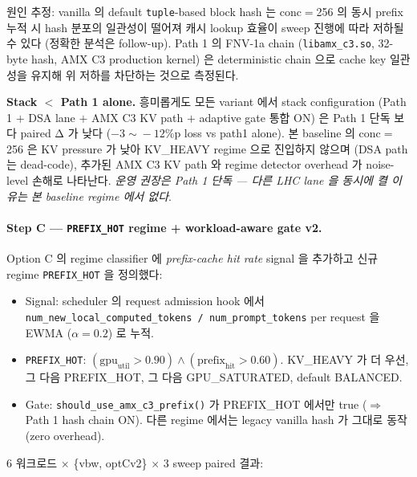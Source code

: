 {원인 추정: vanilla 의 default \texttt{tuple}-based block hash 는
conc$=$256 의 동시 prefix 누적 시 hash 분포의 일관성이 떨어져 캐시 lookup
효율이 sweep 진행에 따라 저하될 수 있다 (정확한 분석은 follow-up).
Path 1 의 FNV-1a chain (\texttt{libamx\_c3.so}, 32-byte hash, AMX C3 production
kernel) 은 deterministic chain 으로 cache key 일관성을 유지해 위 저하를
차단하는 것으로 측정된다.

\textbf{Stack $<$ Path 1 alone.} 흥미롭게도 모든 variant 에서 stack
configuration (Path 1 $+$ DSA lane $+$ AMX C3 KV path $+$ adaptive gate
통합 ON) 은 Path 1 단독 보다 paired Δ 가 낮다 ($-3{\sim}\!-12\%\textrm{p}$
loss vs path1 alone). 본 baseline 의 conc$=$256 은 KV pressure 가 낮아
KV\_HEAVY regime 으로 진입하지 않으며 (DSA path 는 dead-code), 추가된
AMX C3 KV path 와 regime detector overhead 가 noise-level 손해로
나타난다. \emph{운영 권장은 Path 1 단독 — 다른 LHC lane 을 동시에 켤
이유는 본 baseline regime 에서 없다}.

\paragraph{Step C — \texttt{PREFIX\_HOT} regime + workload-aware gate v2.}
Option C 의 regime classifier 에 \emph{prefix-cache hit rate} signal 을
추가하고 신규 regime \texttt{PREFIX\_HOT} 을 정의했다:
\begin{itemize}
    \item Signal: scheduler 의 request admission hook 에서
          \texttt{num\_new\_local\_computed\_tokens / num\_prompt\_tokens}
          per request 을 EWMA ($\alpha\!=\!0.2$) 로 누적.
    \item \texttt{PREFIX\_HOT}: $(\mathrm{gpu}_{\mathrm{util}}\!>\!0.90) \land
          (\mathrm{prefix}_{\mathrm{hit}}\!>\!0.60)$. KV\_HEAVY 가 더 우선,
          그 다음 PREFIX\_HOT, 그 다음 GPU\_SATURATED, default BALANCED.
    \item Gate: \texttt{should\_use\_amx\_c3\_prefix()} 가 PREFIX\_HOT 에서만
          true ($\Rightarrow$ Path 1 hash chain ON). 다른 regime 에서는
          legacy vanilla hash 가 그대로 동작 (zero overhead).
\end{itemize}

6 워크로드 $\times$ \{vbw, optCv2\} $\times$ 3 sweep paired 결과:

}
